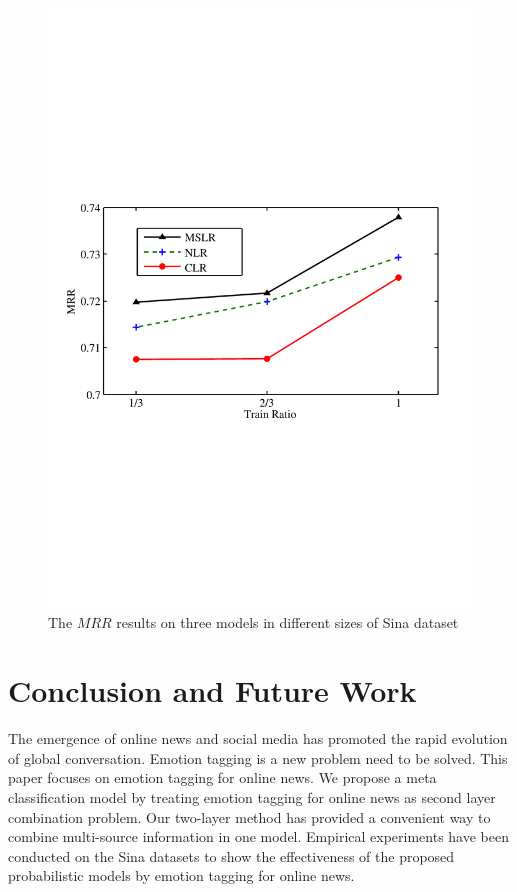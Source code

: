 \documentclass{IEEEtran}
\begin{document}
\begin{figure}[!h]
\centering
\includegraphics[width=1\linewidth,trim=0 240 0 280,clip]{MRR.pdf}
\vspace{-8pt}
\caption{The $MRR$ results on three models in different sizes of Sina dataset}
\label{figure:resultmrr}
\end{figure}

\section{Conclusion and Future Work}
\label{section:conclusion}
The emergence of online news and social media has promoted the rapid evolution of global conversation. Emotion tagging is a new problem need to be solved. This paper focuses on emotion tagging for online news.
We propose a meta classification model by treating emotion tagging for online news as second layer combination problem. Our two-layer method has provided a convenient way to combine multi-source information in one model. Empirical experiments have been conducted on the Sina datasets to show the effectiveness of the proposed probabilistic models by emotion tagging for online news.
\end{document}
